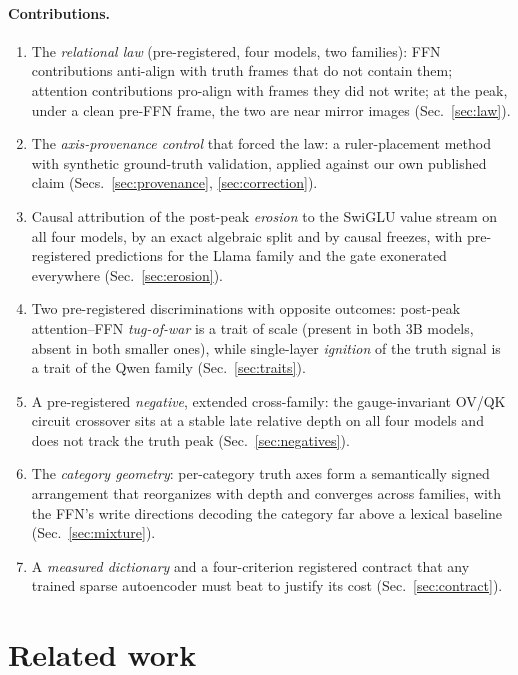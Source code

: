\documentclass[11pt]{article}
\begin{document}
\paragraph{Contributions.}
\begin{enumerate}
\item The \emph{relational law} (pre-registered, four models, two families):
FFN contributions anti-align with truth frames that do not contain them;
attention contributions pro-align with frames they did not write; at the
peak, under a clean pre-FFN frame, the two are near mirror images
(Sec.~\ref{sec:law}).
\item The \emph{axis-provenance control} that forced the law: a
ruler-placement method with synthetic ground-truth validation, applied
against our own published claim (Secs.~\ref{sec:provenance},
\ref{sec:correction}).
\item Causal attribution of the post-peak \emph{erosion} to the SwiGLU value
stream on all four models, by an exact algebraic split and by causal
freezes, with pre-registered predictions for the Llama family and the gate
exonerated everywhere (Sec.~\ref{sec:erosion}).
\item Two pre-registered discriminations with opposite outcomes: post-peak
attention--FFN \emph{tug-of-war} is a trait of scale (present in both 3B
models, absent in both smaller ones), while single-layer \emph{ignition} of
the truth signal is a trait of the Qwen family
(Sec.~\ref{sec:traits}).
\item A pre-registered \emph{negative}, extended cross-family: the
gauge-invariant OV/QK circuit crossover sits at a stable late relative depth
on all four models and does not track the truth peak
(Sec.~\ref{sec:negatives}).
\item The \emph{category geometry}: per-category truth axes form a
semantically signed arrangement that reorganizes with depth and converges
across families, with the FFN's write directions decoding the category far
above a lexical baseline (Sec.~\ref{sec:mixture}).
\item A \emph{measured dictionary} and a four-criterion registered contract
that any trained sparse autoencoder must beat to justify its cost
(Sec.~\ref{sec:contract}).
\end{enumerate}

\section{Related work}
\end{document}
